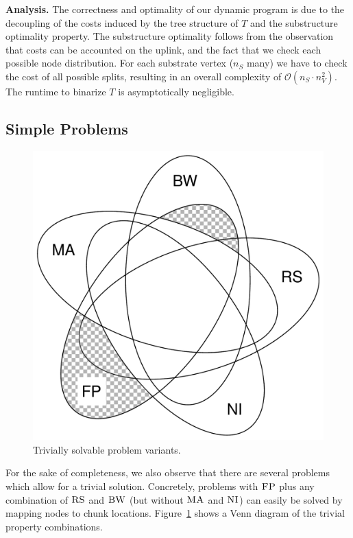 \documentclass[conference,10pt]{IEEEtran}
\newcommand{\CC}{\textsc{NI}}
\newcommand{\FP}{\textsc{FP}}
\newcommand{\RS}{\textsc{RS}}
\newcommand{\BW}{\textsc{BW}}
\newcommand{\MA}{\textsc{MA}}
\newcommand{\Tree}{\ensuremath{T}}
\begin{document}
\textbf{Analysis.}
The correctness and optimality of our dynamic program
is due to the decoupling of the costs induced by the tree
structure of $\Tree$ and the  substructure
optimality property.
The substructure optimality follows from the observation that
costs can be accounted on the uplink, and the fact
 that we check each possible node distribution.
For each substrate vertex ($n_S$ many) we have
to check the cost of all possible splits,
resulting in an overall complexity of $\mathcal{O}(n_S \cdot n_V^2)$.
The runtime to binarize $\Tree$ is asymptotically negligible.




\subsection{Simple Problems}

\begin{figure}
\vspace{-1em}
\includegraphics[width=0.48\columnwidth]{figs/venn_trivial.pdf}
\caption{Trivially solvable problem variants.}
\label{fig:venn_trivial}
\vspace{-1em}
\end{figure}
For the sake of completeness, we also observe that there are
several problems which
allow for a trivial solution. Concretely, problems with $\FP$
plus any combination of
$\RS$ and $\BW$ (but without $\MA$ and $\CC$) can easily be solved by
mapping
nodes to chunk locations.
Figure~\ref{fig:venn_trivial}
shows a Venn diagram of the trivial property combinations.
\end{document}
